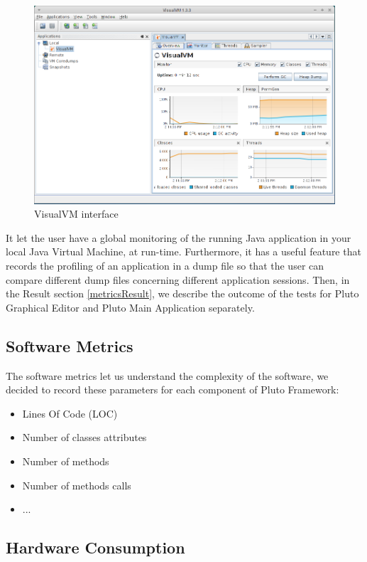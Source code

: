 \begin{figure}[H]
  \centering
  \includegraphics[width=\linewidth]{pictures/visualVM.png}
  \caption{VisualVM interface}
  \label{fig:visualVM}
\end{figure}

It let the user have a global monitoring of the running Java application in your local Java Virtual Machine, at run-time. Furthermore, it has a useful feature that records the profiling of an application in a dump file so that the user can compare different dump files concerning different application sessions.
Then, in the Result section \ref{metricsResult}, we describe the outcome of the tests for Pluto Graphical Editor and Pluto Main Application separately.

\subsection{Software Metrics}

The software metrics let us understand the complexity of the software, we decided to record these parameters for each component of Pluto Framework:

\begin{itemize}
\item Lines Of Code (LOC)
\item Number of classes attributes
\item Number of methods
\item Number of methods calls
\item ...
\end{itemize}

\subsection{Hardware Consumption}

